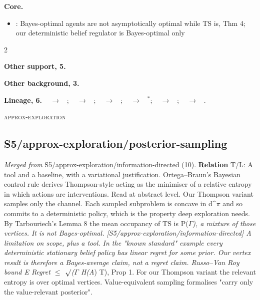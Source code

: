 \documentclass[10pt]{article}
\newcommand{\memb}[1]{\par\smallskip\textbf{#1}\quad}
\begin{document}
\memb{Core.}
\begin{itemize}[nosep,leftmargin=1.2em]
\item \citet{Leike-thompson16}: Bayes-optimal agents are not asymptotically optimal while TS is, Thm 4; our deterministic belief regulator is Bayes-optimal only
\end{itemize}
\begin{multicols}{2}
\memb{Other support, 5.} \citetext{\citealp{Hutter-universal05}; \citealp{Lattimore-asymptotically11}; \citealp{Orseau-universal13}; \citealp{Leike-bad15}; \citealp{Cohen-curiosity20}}

\memb{Other background, 3.} {\footnotesize \citetext{\citealp{Orseau-universal14}; \citealp{Leike-exploration16}; \citealp{Aslanides-universal17}}}

\end{multicols}
\memb{Lineage, 6.} {\footnotesize \citeauthor{Hutter-universal05}~\citeyear{Hutter-universal05} $\to$ \citeauthor{Orseau-universal13}~\citeyear{Orseau-universal13}; \citeauthor{Lattimore-asymptotically11}~\citeyear{Lattimore-asymptotically11} $\to$ \citeauthor{Leike-thompson16}~\citeyear{Leike-thompson16}; \citeauthor{Lattimore-asymptotically11}~\citeyear{Lattimore-asymptotically11} $\to$ \citeauthor{Cohen-curiosity20}~\citeyear{Cohen-curiosity20}; \citeauthor{Orseau-universal13}~\citeyear{Orseau-universal13} $\to$ \citeauthor{Leike-thompson16}~\citeyear{Leike-thompson16}$^\ast$; \citeauthor{Orseau-universal13}~\citeyear{Orseau-universal13} $\to$ \citeauthor{Cohen-curiosity20}~\citeyear{Cohen-curiosity20}; \citeauthor{Leike-thompson16}~\citeyear{Leike-thompson16} $\to$ \citeauthor{Cohen-curiosity20}~\citeyear{Cohen-curiosity20}.}

\medskip\textsc{approx-exploration}

\subsection{S5/approx-exploration/posterior-sampling}\label{node:S5-S5-approx-exploration-posterior-sampling}
\textit{Merged from} S5/approx-exploration/information-directed (10). \textbf{Relation} \textsf{T}/\textsf{L}: A tool and a baseline, with a variational justification. Ortega--Braun's Bayesian control rule derives Thompson-style acting as the minimiser of a relative entropy in which actions are interventions. Read at abstract level. Our Thompson variant samples only the channel. Each sampled subproblem is concave in d\^{}\ensuremath{\pi} and so commits to a deterministic policy, which is the property deep exploration needs. By Tarbouriech's Lemma 8 the mean occupancy of TS is P(\ensuremath{\Gamma}\emph{), a mixture of those vertices. It is not Bayes-optimal. [S5/approx-exploration/information-directed] A limitation on scope, plus a tool. In the "known standard" example every deterministic stationary belief policy has linear regret for some prior. Our vertex result is therefore a Bayes-average claim, not a regret claim. Russo--Van Roy bound E Regret \ensuremath{\leq} \ensuremath{\surd}(\ensuremath{\Gamma} H(A}) T), Prop 1. For our Thompson variant the relevant entropy is over optimal vertices. Value-equivalent sampling formalises "carry only the value-relevant posterior".
\end{document}
